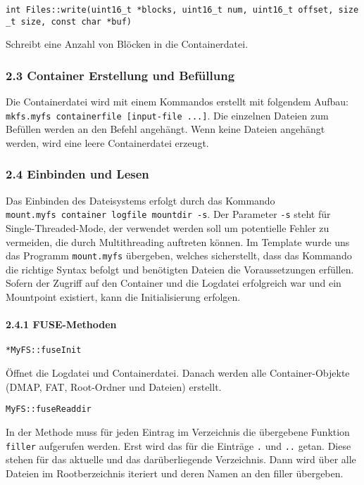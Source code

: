 \documentclass[]{article}
\let\oldparagraph\paragraph
\renewcommand{\paragraph}[1]{\oldparagraph{#1}\mbox{}}
\begin{document}
\texttt{int\ Files::write(uint16\_t\ *blocks,\ uint16\_t\ num,\ uint16\_t\ offset,\ size\_t\ size,\ const\ char\ *buf)}

Schreibt eine Anzahl von Blöcken in die Containerdatei.

\hypertarget{container-erstellung-und-befuxfcllung}{%
\subsubsection{2.3 Container Erstellung und
Befüllung}\label{container-erstellung-und-befuxfcllung}}

Die Containerdatei wird mit einem Kommandos erstellt mit folgendem
Aufbau: \texttt{mkfs.myfs\ containerfile\ {[}input-file\ ...{]}}. Die
einzelnen Dateien zum Befüllen werden an den Befehl angehängt. Wenn
keine Dateien angehängt werden, wird eine leere Containerdatei erzeugt.

\hypertarget{einbinden-und-lesen}{%
\subsubsection{2.4 Einbinden und Lesen}\label{einbinden-und-lesen}}

Das Einbinden des Dateisystems erfolgt durch das Kommando
\texttt{mount.myfs\ container\ logfile\ mountdir\ -s}. Der Parameter
\texttt{-s} steht für Single-Threaded-Mode, der verwendet werden soll um
potentielle Fehler zu vermeiden, die durch Multithreading auftreten
können. Im Template wurde uns das Programm \texttt{mount.myfs}
übergeben, welches sicherstellt, dass das Kommando die richtige Syntax
befolgt und benötigten Dateien die Voraussetzungen erfüllen. Sofern der
Zugriff auf den Container und die Logdatei erfolgreich war und ein
Mountpoint existiert, kann die Initialisierung erfolgen.

\hypertarget{fuse-methoden}{%
\paragraph{2.4.1 FUSE-Methoden}\label{fuse-methoden}}

\texttt{*MyFS::fuseInit}

Öffnet die Logdatei und Containerdatei. Danach werden alle
Container-Objekte (DMAP, FAT, Root-Ordner und Dateien) erstellt.

\texttt{MyFS::fuseReaddir}

In der Methode muss für jeden Eintrag im Verzeichnis die übergebene
Funktion \texttt{filler} aufgerufen werden. Erst wird das für die
Einträge \texttt{.} und \texttt{..} getan. Diese stehen für das aktuelle
und das darüberliegende Verzeichnis. Dann wird über alle Dateien im
Rootberzeichnis iteriert und deren Namen an den filler übergeben.
\end{document}

